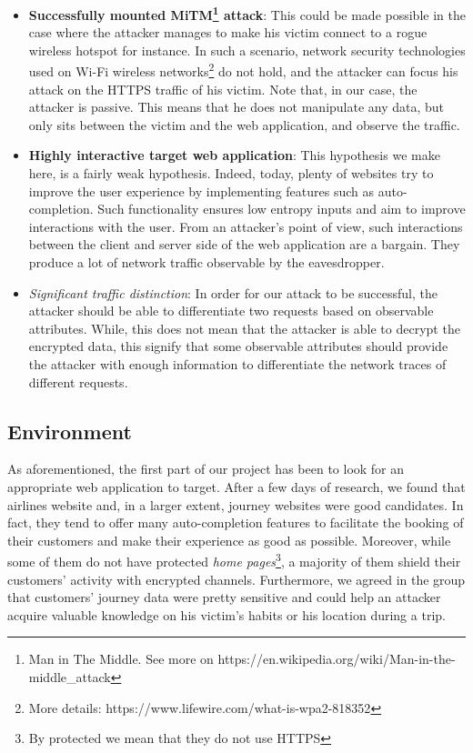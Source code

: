 \documentclass[runningheads]{llncs}
\begin{document}
\begin{itemize}
    \item \textbf{Successfully mounted MiTM\footnote{Man in The Middle. See more on https://en.wikipedia.org/wiki/Man-in-the-middle\_attack} attack}: This could be made possible in the case where the attacker manages to make his victim connect to a rogue wireless hotspot for instance. In such a scenario, network security technologies used on Wi-Fi wireless networks\footnote{More details: https://www.lifewire.com/what-is-wpa2-818352} do not hold, and the attacker can focus his attack on the HTTPS traffic of his victim. Note that, in our case, the attacker is passive. This means that he does not manipulate any data, but only sits between the victim and the web application, and observe the traffic.
    \item \textbf{Highly interactive target web application}: This hypothesis we make here, is a fairly weak hypothesis. Indeed, today, plenty of websites try to improve the user experience by implementing features such as auto-completion. Such functionality ensures low entropy inputs and aim to improve interactions with the user. From an attacker's point of view, such interactions between the client and server side of the web application are a bargain. They produce a lot of network traffic observable by the eavesdropper.
    \item \emph{Significant traffic distinction}: In order for our attack to be successful, the attacker should be able to differentiate two requests based on observable attributes. While, this does not mean that the attacker is able to decrypt the encrypted data, this signify that some observable attributes should provide the attacker with enough information to differentiate the network traces of different requests.
\end{itemize}


\subsection{Environment}

As aforementioned, the first part of our project has been to look for an appropriate web application to target. After a few days of research, we found that airlines website and, in a larger extent, journey websites were good candidates. In fact, they tend to offer many auto-completion features to facilitate the booking of their customers and make their experience as good as possible. Moreover, while some of them do not have protected \emph{home pages}\footnote{By protected we mean that they do not use HTTPS}, a majority of them shield their customers' activity with encrypted channels. Furthermore, we agreed in the group that customers' journey data were pretty sensitive and could help an attacker acquire valuable knowledge on his victim's habits or his location during a trip.
\end{document}
